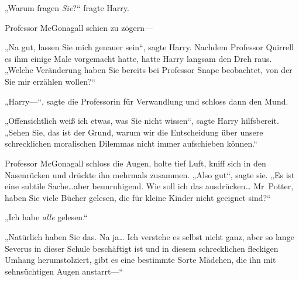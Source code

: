„Warum fragen \emph{Sie}?“ fragte Harry.

Professor McGonagall schien zu zögern—

„Na gut, lassen Sie mich genauer sein“, sagte Harry. Nachdem Professor Quirrell es ihm einige Male vorgemacht hatte, hatte Harry langsam den Dreh raus.
„Welche Veränderung haben Sie bereits bei Professor Snape beobachtet, von der Sie mir erzählen wollen?“

„Harry—“, sagte die Professorin für Verwandlung und schloss dann den Mund.

„Offensichtlich weiß ich etwas, was Sie nicht wissen“, sagte Harry hilfsbereit. „Sehen Sie, das ist der Grund, warum wir die Entscheidung über unsere schrecklichen moralischen Dilemmas nicht immer aufschieben können.“

Professor McGonagall schloss die Augen, holte tief Luft, kniff sich in den Nasenrücken und drückte ihn mehrmals zusammen.
„Also gut“, sagte sie. „Es ist eine subtile Sache…aber beunruhigend. Wie soll ich das ausdrücken… Mr~Potter, haben Sie viele Bücher gelesen, die für kleine Kinder nicht geeignet sind?“

„Ich habe \emph{alle} gelesen.“

„Natürlich haben Sie das. Na ja… Ich verstehe es selbst nicht ganz, aber so lange Severus in dieser Schule beschäftigt ist und in diesem schrecklichen fleckigen Umhang herumstolziert, gibt es eine bestimmte Sorte Mädchen, die ihn mit sehnsüchtigen Augen anstarrt—“

